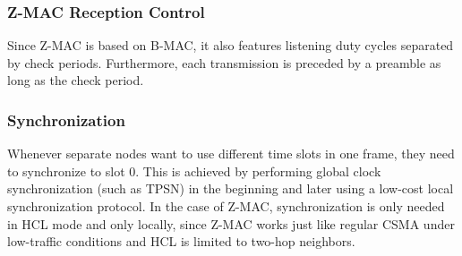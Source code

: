 \subsubsection{Z-MAC Reception Control}
Since Z-MAC is based on B-MAC, it also features listening duty cycles separated by check periods. Furthermore, each transmission is preceded by a preamble as long as the check period.

\subsubsection{Synchronization}
Whenever separate nodes want to use different time slots in one frame, they need to synchronize to slot 0. This is achieved by performing global clock synchronization (such as TPSN) in the beginning and later using a low-cost local synchronization protocol. In the case of Z-MAC, synchronization is only needed in HCL mode and only locally, since Z-MAC works just like regular CSMA under low-traffic conditions and HCL is limited to two-hop neighbors.
